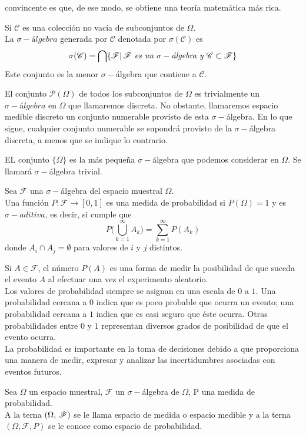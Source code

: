 convincente es que, de ese modo, se obtiene una teoría matemática más rica.
\begin{Def}
    Si $\mathscr{C}$ es una colección no vacía de subconjuntos de $\Omega$.\\La $\sigma-\textit{álgebra}$ generada por $\mathscr{C}$ denotada por $\sigma(\mathscr{C})$ es $$\sigma(\mathscr{C})=\bigcap\{\mathscr{F}|\thinspace\mathscr{F} \textit{ es un }\sigma-\textit{álgebra y }  \mathscr{C}\subset\mathscr{F}\}$$
    Este conjunto es la menor $\sigma-$álgebra que contiene a $\mathscr{C}$.
\end{Def}
\begin{Ejm}
    El conjunto $\mathscr{P}(\Omega)$ de todos los subconjuntos de $\Omega$ es trivialmente un $\sigma-álgebra$ en $\Omega$ que llamaremos discreta. No obstante, llamaremos espacio medible discreto un conjunto numerable provisto de esta $\sigma-$álgebra. En lo que sigue, cualquier conjunto numerable se supondrá provisto de la $\sigma-$álgebra discreta, a menos que se indique lo contrario.
\end{Ejm}
\begin{Ejm}
    EL conjunto $\{\Omega\}$ es la más pequeña $\sigma-$álgebra que podemos considerar en $\Omega$. Se llamará $\sigma-$álgebra trivial.
\end{Ejm}
\begin{Def}
    \label{def-medidaProbabilidad}
    Sea $\mathscr{F}$ una $\sigma-$álgebra del espacio muestral $\Omega$.\\
    Una función $P:\mathscr{F}\rightarrow [0,1]$ es una medida de probabilidad si $P(\Omega)=1$ y es $\sigma-aditiva$, es decir, si cumple que $$P\big(\bigcup_{k=1}^\infty A_k\big)=\sum_{k=1}^\infty P(A_k)$$
    donde $A_i\cap A_j=\emptyset$ para valores de $i$ y $j$ distintos.
\end{Def}
Si $A\in\mathscr{F}$, el número $P(A)$ es una forma de medir la posibilidad de que suceda el evento $A$ al efectuar una vez el experimento aleatorio.\\
Los valores de probabilidad siempre se asignan en una escala de $0$ a $1$. Una probabilidad cercana a $0$ indica que es poco probable que ocurra un evento; una probabilidad cercana a $1$ indica que es casi seguro que éste ocurra. Otras probabilidades entre $0$ y $1$ representan diversos grados de posibilidad de que el evento ocurra.\\
La probabilidad es importante en la toma de decisiones debido a que proporciona una manera de medir, expresar y analizar las incertidumbres asociadas con eventos futuros.
\begin{Def}
    Sea $\Omega$ un espacio muestral, $\mathscr{F}$ un $\sigma-$álgebra de $\Omega$, P una medida de probabilidad.\\
    A la terna $(\Omega,\thinspace\mathscr{F})$ se le llama espacio de medida o espacio medible y a la terna $(\Omega,\mathscr{F},P)$ se le conoce como espacio de probabilidad.
\end{Def}